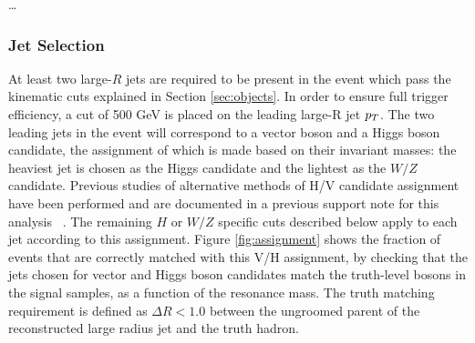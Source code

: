 \dots

\subsubsection{Jet Selection}
At least two large-$R$ jets are required to be present in the event which pass the kinematic cuts explained in Section \ref{sec:objects}.
In order to ensure full trigger efficiency, a cut of 500 GeV is placed on the leading large-R jet $p_{T}$.
The two leading jets in the event will correspond to a vector boson and a Higgs boson candidate, the assignment of which is made based on their invariant masses: the heaviest jet is chosen as the Higgs candidate and the lightest as the $W/Z$ candidate.
Previous studies of alternative methods of H/V candidate assignment have been performed and are documented in a previous support note for this analysis ~\cite{ATL-COM-PHYS-2016-482}.
The remaining $H$ or $W/Z$ specific cuts described below apply to each jet according to this assignment.
Figure \ref{fig:assignment} shows the fraction of events that are correctly matched with this V/H assignment, by checking that the jets chosen for vector and Higgs boson candidates match the truth-level bosons in the signal samples, as a function of the resonance mass.
The truth matching requirement is defined as $\Delta R < 1.0$ between the ungroomed parent of the reconstructed large radius jet and the truth hadron.


